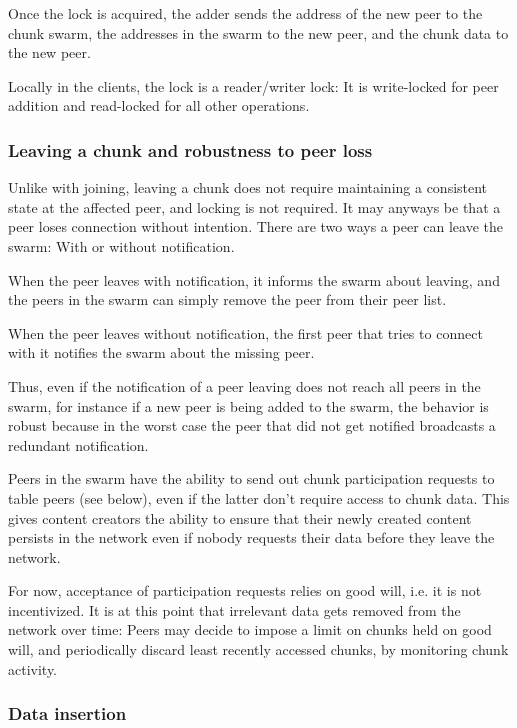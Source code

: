 \documentclass{article}
\begin{document}
Once the lock is acquired, the adder sends the address of the new peer to the
chunk swarm, the addresses in the swarm to the new peer, and the chunk data to
the new peer.

Locally in the clients, the lock is a reader/writer lock: It is write-locked
for peer addition and read-locked for all other operations.

\subsubsection{Leaving a chunk and robustness to peer loss}

Unlike with joining, leaving a chunk does not require maintaining a consistent
state at the affected peer, and locking is not required. It may anyways be that
a peer loses connection without intention. There are two ways a peer can leave
the swarm: With or without notification.

When the peer leaves with notification, it informs the swarm about leaving, and
the peers in the swarm can simply remove the peer from their peer list.

When the peer leaves without notification, the first peer that tries to connect
with it notifies the swarm about the missing peer.

Thus, even if the notification of a peer leaving does not reach all peers in the
swarm, for instance if a new peer is being added to the swarm, the behavior
is robust because in the worst case the peer that did not get notified
broadcasts a redundant notification.

Peers in the swarm have the ability to send out chunk participation requests
to table peers (see below), even if the latter don't require access to chunk
data. This gives content creators the ability to ensure that their newly created
content persists in the network even if nobody requests their data before they
leave the network. 

For now, acceptance of participation requests relies on good will, i.e. it is 
not incentivized. It is at this point that irrelevant data gets removed from the
network over time: Peers may decide to impose a limit on chunks held on good
will, and periodically discard least recently accessed chunks, by monitoring
chunk activity.

\subsubsection{Data insertion}
\end{document}
